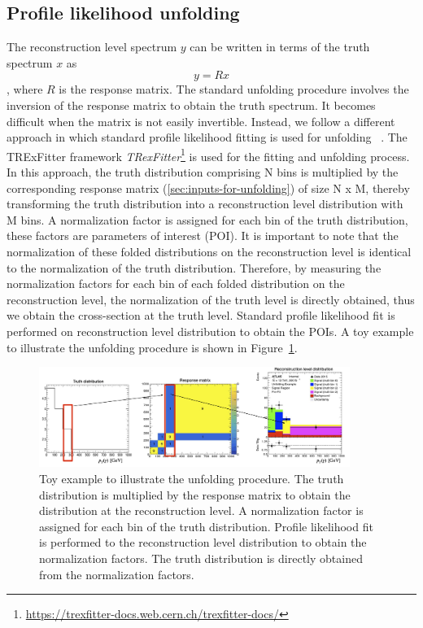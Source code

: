 \subsection{Profile likelihood unfolding}
\label{sec:profile-likelihodd-unfolding}
The reconstruction level spectrum $y$ can be written in terms of the truth spectrum $x$ as $$ y = R x$$, where $R$ is the response matrix. The standard unfolding procedure involves the inversion of the response matrix to obtain the truth spectrum. It becomes difficult when the matrix is not easily invertible. Instead, we follow a different approach in which standard profile likelihood fitting is used for unfolding ~\cite{cls_3}. 
The TRExFitter framework \emph{TRexFitter}\footnote{\url{https://trexfitter-docs.web.cern.ch/trexfitter-docs/}} is used for the fitting and unfolding process. In this approach, the truth distribution comprising N bins is multiplied by the corresponding response matrix (\cref{sec:inputs-for-unfolding}) of size N x M, thereby transforming the truth distribution into a reconstruction level distribution with M bins. A normalization factor is assigned for each bin of the truth distribution, these factors are parameters of interest (POI). It is important to note that the normalization of these folded distributions on the reconstruction level is identical to the normalization of the truth distribution. Therefore, by measuring the normalization factors for each bin of each folded distribution on the reconstruction level, the normalization of the truth level is directly obtained, thus we obtain the cross-section at the truth level. Standard profile likelihood fit is performed on reconstruction level distribution to obtain the POIs. A toy example to illustrate the unfolding procedure is shown in Figure~\ref{fig:unfolding_toy_example}.

\begin{figure}[ht]
    \centering
    \includegraphics[width=0.9\textwidth]{figures/toy_profile_likelihood_fit.png}
    \caption{Toy example to illustrate the unfolding procedure. The truth distribution is multiplied by the response matrix to obtain the distribution at the reconstruction level. A normalization factor is assigned for each bin of the truth distribution. Profile likelihood fit is performed to the reconstruction level distribution to obtain the normalization factors. The truth distribution is directly obtained from the normalization factors.}

    \label{fig:unfolding_toy_example}
\end{figure}
\FloatBarrier

